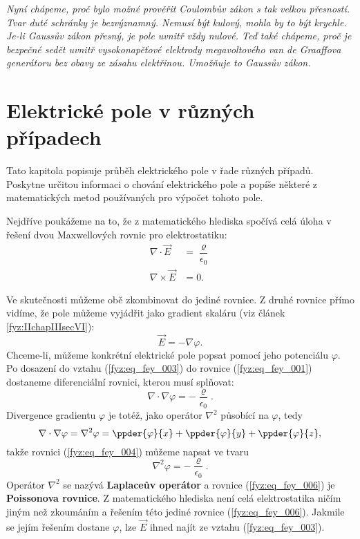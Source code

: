   \emph{Nyní chápeme, proč bylo možné prověřit Coulombův zákon s tak velkou přesností. Tvar 
  duté schránky je bezvýznamný. Nemusí být kulový, mohla by to být krychle. Je-li Gaussův zákon 
  přesný, je pole uvnitř vždy nulové. Teď také chápeme, proč je bezpečné sedět uvnitř 
  vysokonapěťové elektrody megavoltového van de Graaffova generátoru bez obavy ze zásahu 
  elektřinou. Umožňuje to Gaussův zákon.}

\section{Elektrické pole v různých případech}\label{fyz:IIchapVsecX}
  Tato kapitola popisuje průběh elektrického pole v řade různých případů. Poskytne určitou 
  informaci o chování elektrického pole a popíše některé z matematických metod používaných pro 
  výpočet tohoto pole.
  
  Nejdříve poukážeme na to, že z matematického hlediska spočívá celá úloha v řešení dvou 
  Maxwellových rovnic pro elektrostatiku:
  \begin{align}
    \nabla\cdot\vec{E}  &= \dfrac{\varrho}{\epsilon_0}  \label{fyz:eq_fey_001} \\
    \nabla\times\vec{E} &= 0.                           \label{fyz:eq_fey_002}
  \end{align}
  
  Ve skutečnosti můžeme obě zkombinovat do jediné rovnice. Z druhé rovnice přímo vidíme, že pole 
  můžeme vyjádřit jako gradient skaláru (viz článek \ref{fyz:IIchapIIIsecVI}):
  \begin{equation}\label{fyz:eq_fey_003}
    \vec{E} = - \nabla\varphi.
  \end{equation}
  Chceme-li, můžeme konkrétní elektrické pole popsat pomocí jeho potenciálu \(\varphi\). Po 
  dosazení do vztahu (\ref{fyz:eq_fey_003}) do rovnice (\ref{fyz:eq_fey_001}) dostaneme 
  diferenciální rovnici, kterou musí splňovat:
  \begin{equation}\label{fyz:eq_fey_004}
  \nabla\cdot\nabla\varphi = - \dfrac{\varrho}{\epsilon_0}.
  \end{equation}
  Divergence gradientu \(\varphi\) je totéž, jako operátor \(\nabla^2\) působící na \(\varphi\), 
  tedy
  \begin{equation}\label{fyz:eq_fey_005}
  \nabla\cdot\nabla\varphi = \nabla^2\varphi 
    = \ppder{\varphi}{x} + \ppder{\varphi}{y} + \ppder{\varphi}{z},
  \end{equation}
  takže rovnici (\ref{fyz:eq_fey_004}) můžeme napsat ve tvaru
  \begin{equation}\label{fyz:eq_fey_006}
  \nabla^2\varphi = - \dfrac{\varrho}{\epsilon_0}.
  \end{equation}
  Operátor \(\nabla^2\) se nazývá \textbf{Laplaceův operátor} a rovnice (\ref{fyz:eq_fey_006}) je 
  \textbf{Poissonova rovnice}. Z matematického hlediska není celá elektrostatika ničím jiným než 
  zkoumáním a řešením této jediné rovnice (\ref{fyz:eq_fey_006}). Jakmile se jejím řešením 
  dostane \(\varphi\), lze \(\vec{E}\) ihned najít ze vztahu (\ref{fyz:eq_fey_003}).
  
